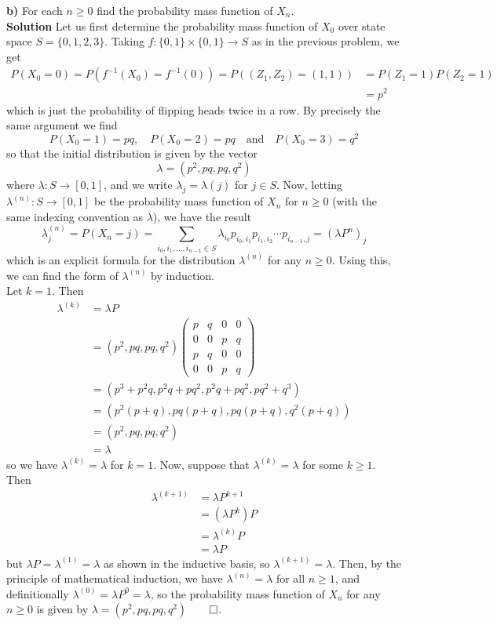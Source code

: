 \documentclass[11pt, letterpaper]{article}
\begin{document}
{\bf b)} For each $n\geq 0$ find the probability mass function of $X_n$.\\[10pt]
{\bf Solution} Let us first determine the probability mass function of $X_0$ over state space $S=\{0,1,2,3\}$. Taking $f:\{0,1\}\times\{0,1\}\rightarrow S$ as
in the previous problem, we get
\begin{align*}
    P(X_0=0)=P(f^{-1}(X_0)=f^{-1}(0))=P((Z_1,Z_2)=(1,1))&=P(Z_1=1)P(Z_2=1)\tag{independence of flips}\\
    &=p^2
\end{align*}
which is just the probability of flipping heads twice in a row. By precisely the same argument we find
\[P(X_0=1)=pq,\quad P(X_0=2)=pq\quad\text{and}\quad P(X_0=3)=q^2\]
so that the initial distribution is given by the vector
\[\lambda=(p^2,pq,pq,q^2)\]
where $\lambda:S\rightarrow [0,1]$, and we write $\lambda_j=\lambda(j)$ for $j\in S$. Now, letting $\lambda^{(n)}:S\rightarrow[0,1]$ be the probability mass function of $X_n$ for $n\geq 0$ (with the same indexing convention as $\lambda$), we have the result
\[\lambda^{(n)}_j=P(X_n=j)=\sum_{i_0,i_1,\dots,i_{n-1}\in S}\lambda_{i_0}p_{i_0,i_1}p_{i_1,i_2}\cdots p_{i_{n-1},j}=(\lambda P^n)_j\]
which is an explicit formula for the distribution $\lambda^{(n)}$ for any $n\geq 0$. Using this, we can find the form of $\lambda^{(n)}$ by induction.\\[10pt]
Let $k=1$. Then
\begin{align*}
    \lambda^{(k)}&=\lambda P\\
    &=(p^2,pq,pq,q^2)\begin{pmatrix}
       p & q & 0 & 0\\
       0 & 0 & p & q\\ 
       p & q & 0 & 0\\
       0 & 0 & p & q
    \end{pmatrix}\\
    &=(p^3+p^2q,p^2q+pq^2,p^2q+pq^2,pq^2+q^3)\\
    &=(p^2(p+q), pq(p+q), pq(p+q), q^2(p+q))\\
    &=(p^2,pq, pq, q^2)\tag{$p+q=p+1-p=1$}\\
    &=\lambda
\end{align*}
so we have $\lambda^{(k)}=\lambda$ for $k=1$. Now, suppose that $\lambda^{(k)}=\lambda$ for some $k\geq 1$. Then
\begin{align*}
    \lambda^{(k+1)}&=\lambda P^{k+1}\\
    &=(\lambda P^k)P\tag{associativity}\\
    &=\lambda^{(k)}P\\
    &=\lambda P\tag{inductive hypothesis}
\end{align*}
but $\lambda P=\lambda^{(1)}=\lambda$ as shown in the inductive basis, so $\lambda^{(k+1)}=\lambda$. Then, by the principle of
mathematical induction, we have $\lambda^{(n)}=\lambda$ for all $n\geq 1$, and definitionally $\lambda^{(0)}=\lambda P^0=\lambda$, so the
probability mass function of $X_n$ for any $n\geq 0$ is given by $\lambda=(p^2,pq,pq,q^2)$\hfill{$\qed$}.
\end{document}
